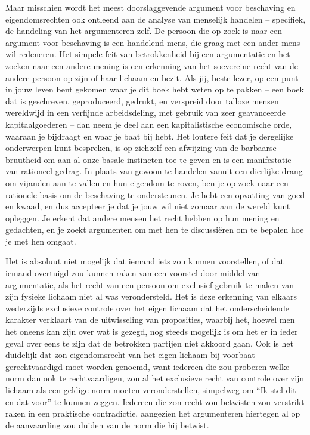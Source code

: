 Maar misschien wordt het meest doorslaggevende argument voor beschaving en eigendomsrechten ook ontleend aan de analyse van menselijk handelen -- specifiek, de handeling van het argumenteren zelf.\autocite{219} De persoon die op zoek is naar een argument voor beschaving is een handelend mens, die graag met een ander mens wil redeneren. Het simpele feit van betrokkenheid bij een argumentatie en het zoeken naar een andere mening is een erkenning van het soevereine recht van de andere persoon op zijn of haar lichaam en bezit. Als jij, beste lezer, op een punt in jouw leven bent gekomen waar je dit boek hebt weten op te pakken -- een boek dat is geschreven, geproduceerd, gedrukt, en verspreid door talloze mensen wereldwijd in een verfijnde arbeidsdeling, met gebruik van zeer geavanceerde kapitaalgoederen -- dan neem je deel aan een kapitalistische economische orde, waaraan je bijdraagt en waar je baat bij hebt. Het loutere feit dat je dergelijke onderwerpen kunt bespreken, is op zichzelf een afwijzing van de barbaarse bruutheid om aan al onze basale instincten toe te geven en is een manifestatie van rationeel gedrag. In plaats van gewoon te handelen vanuit een dierlijke drang om vijanden aan te vallen en hun eigendom te roven, ben je op zoek naar een rationele basis om de beschaving te ondersteunen. Je hebt een opvatting van goed en kwaad, en dus accepteer je dat je jouw wil niet zomaar aan de wereld kunt opleggen. Je erkent dat andere mensen het recht hebben op hun mening en gedachten, en je zoekt argumenten om met hen te discussiëren om te bepalen hoe je met hen omgaat.

\begin{blockquotebox}
    Het is absoluut niet mogelijk dat iemand iets zou kunnen voorstellen, of dat iemand overtuigd zou kunnen raken van een voorstel door middel van argumentatie, als het recht van een persoon om exclusief gebruik te maken van zijn fysieke lichaam niet al was verondersteld. Het is deze erkenning van elkaars wederzijds exclusieve controle over het eigen lichaam dat het onderscheidende karakter verklaart van de uitwisseling van proposities, waarbij het, hoewel men het oneens kan zijn over wat is gezegd, nog steeds mogelijk is om het er in ieder geval over eens te zijn dat de betrokken partijen niet akkoord gaan. Ook is het duidelijk dat zo\textquotesingle n eigendomsrecht van het eigen lichaam bij voorbaat gerechtvaardigd moet worden genoemd, want iedereen die zou proberen welke norm dan ook te rechtvaardigen, zou al het exclusieve recht van controle over zijn lichaam als een geldige norm moeten veronderstellen, simpelweg om ``Ik stel dit en dat voor'' te kunnen zeggen. Iedereen die zo\textquotesingle n recht zou betwisten zou verstrikt raken in een praktische contradictie, aangezien het argumenteren hiertegen al op de aanvaarding zou duiden van de norm die hij betwist.\footnotemark
\end{blockquotebox}
\autocite{220}

